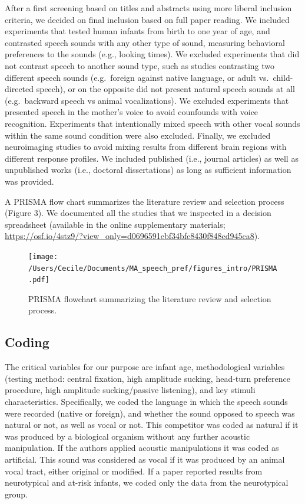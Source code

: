 \documentclass[man]{apa6}
\begin{document}
After a first screening based on titles and abstracts using more liberal
inclusion criteria, we decided on final inclusion based on full paper
reading. We included experiments that tested human infants from birth to
one year of age, and contrasted speech sounds with any other type of
sound, measuring behavioral preferences to the sounds (e.g., looking
times). We excluded experiments that did not contrast speech to another
sound type, such as studies contrasting two different speech sounds
(e.g.~foreign against native language, or adult vs.~child-directed
speech), or on the opposite did not present natural speech sounds at all
(e.g.~backward speech vs animal vocalizations). We excluded experiments
that presented speech in the mother's voice to avoid counfounds with
voice recognition. Experiments that intentionally mixed speech with
other vocal sounds within the same sound condition were also excluded.
Finally, we excluded neuroimaging studies to avoid mixing results from
different brain regions with different response profiles. We included
published (i.e., journal articles) as well as unpublished works (i.e.,
doctoral dissertations) as long as sufficient information was provided.

A PRISMA flow chart summarizes the literature review and selection
process (Figure 3). We documented all the studies that we inspected in a
decision spreadsheet (available in the online supplementary materials;
\url{https://osf.io/4stz9/?view_only=d0696591ebf34bfc8430f848cd945ca8}).

\begin{figure}
\centering
\texttt{[image: /Users/Cecile/Documents/MA\_speech\_pref/figures\_intro/PRISMA.pdf]}
\caption{\label{fig:unnamed-chunk-3}PRISMA flowchart summarizing the
literature review and selection process.}
\end{figure}

\subsection{Coding}\label{coding}

The critical variables for our purpose are infant age, methodological
variables (testing method: central fixation, high amplitude sucking,
head-turn preference procedure, high amplitude sucking/passive
listening), and key stimuli characteristics. Specifically, we coded the
language in which the speech sounds were recorded (native or foreign),
and whether the sound opposed to speech was natural or not, as well as
vocal or not. This competitor was coded as natural if it was produced by
a biological organism without any further acoustic manipulation. If the
authors applied acoustic manipulations it was coded as artificial. This
sound was considered as vocal if it was produced by an animal vocal
tract, either original or modified. If a paper reported results from
neurotypical and at-risk infants, we coded only the data from the
neurotypical group.
\end{document}
